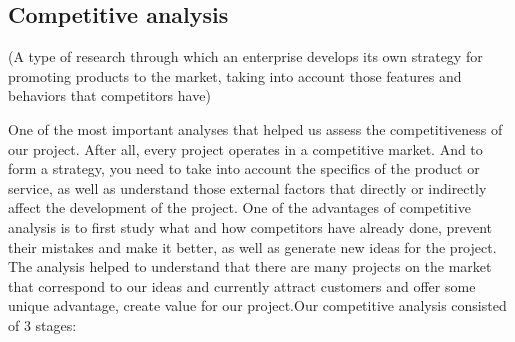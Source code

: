 \subsection{Competitive analysis}

(A type of research through which an enterprise develops its own strategy for promoting products to the market, taking into account those features and behaviors that competitors have)

One of the most important analyses that helped us assess the competitiveness of our project. \cite{marketResearch} After all, every project operates in a competitive market. And to form a strategy, you need to take into account the specifics of the product or service, as well as understand those external factors that directly or indirectly affect the development of the project. One of the advantages of competitive analysis is to first study what and how competitors have already done, prevent their mistakes and make it better, as well as generate new ideas for the project. The analysis helped to understand that there are many projects on the market that correspond to our ideas and currently attract customers and offer some unique advantage, create value for our project.Our competitive analysis consisted of 3 stages:
